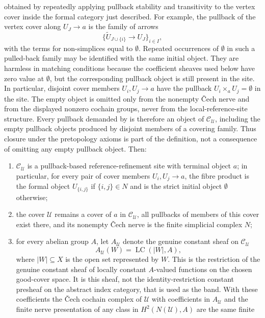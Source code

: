 \begin{lemma}
obtained by repeatedly applying pullback stability and transitivity to
the vertex cover inside the formal category just described. For example,
the pullback of the vertex cover along \(U_J\to a\) is the family of
arrows
\[
\{\widetilde U_{J\cup\{i\}}\to U_J\}_{i\in I},
\]
with the terms for non-simplices equal to \(\emptyset\). Repeated
occurrences of \(\emptyset\) in such a pulled-back family may be
identified with the same initial object. They are harmless in matching
conditions because the coefficient sheaves used below have zero value at
\(\emptyset\), but the corresponding pullback object is still present in
the site. In particular, disjoint cover members \(U_i,U_j\to a\) have the
pullback \(U_i\times_aU_j=\emptyset\) in the site. The empty object is
omitted only from the nonempty \v{C}ech nerve and from the displayed
nonzero cochain groups, never from the local-reference-site structure.
Every pullback demanded by  is therefore
an object of \(\mathcal C_{\mathcal U}\), including the empty pullback
objects produced by disjoint members of a covering family.
Thus closure under the pretopology axioms is part of the definition, not a
consequence of omitting any empty pullback object. Then:
\begin{enumerate}[label=(\roman*),nosep]
\item $\mathcal C_{\mathcal U}$ is a pullback-based reference-refinement site
with terminal object $a$; in particular, for every pair of cover members
$U_i,U_j\to a$, the fibre product is the formal object $U_{\{i,j\}}$ if
$\{i,j\}\in N$ and is the strict initial object $\emptyset$ otherwise;
\item the cover $\mathcal U$ remains a cover of $a$ in
$\mathcal C_{\mathcal U}$, all pullbacks of members of this cover exist
there, and its nonempty \v{C}ech nerve is the finite simplicial complex
$N$;
\item for every abelian group $A$, let $A_{\mathcal U}$ denote the genuine
constant sheaf
on \(\mathcal C_{\mathcal U}\)
\[
A_{\mathcal U}(W)=\operatorname{LC}(|W|,A),
\]
where \(|W|\subseteq X\) is the open set represented by \(W\). This is the
restriction of the genuine constant sheaf of locally constant
\(A\)-valued functions on the chosen good-cover space. It is this
sheaf, not the identity-restriction constant presheaf on the abstract
index category, that is used as the band. With these coefficients the
\v{C}ech cochain complex of
$\mathcal U$ with coefficients in $A_{\mathcal U}$ and the finite nerve
presentation of any class in $H^2(N(\mathcal U),A)$ are the same finite

\end{enumerate}
\end{lemma}
